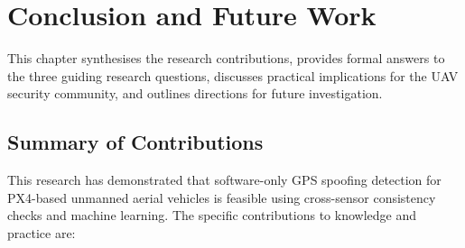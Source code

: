\chapter{Conclusion and Future Work}

This chapter synthesises the research contributions, provides formal answers to the three guiding research questions, discusses practical implications for the UAV security community, and outlines directions for future investigation.

\section{Summary of Contributions}

This research has demonstrated that software-only GPS spoofing detection for PX4-based unmanned aerial vehicles is feasible using cross-sensor consistency checks and machine learning. The specific contributions to knowledge and practice are:

